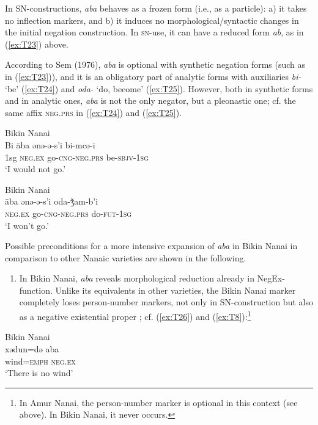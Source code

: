\documentclass[output=paper]{langscibook}
\begin{document}
In SN-constructions, \textit{aba} behaves as a frozen form (i.e., as a particle): a) it takes no inflection markers, and b) it induces no morphological/syntactic changes in the initial negation construction. In \textsc{sn}-use, it can have a reduced form \textit{ab}, as in (\ref{ex:T23}) above.

According to Sem (1976), \textit{aba} is optional with synthetic negation forms (such as in (\ref{ex:T23})), and it is an obligatory part of analytic forms with auxiliaries \textit{bi-} ‘be’ (\ref{ex:T24}) and \textit{oda-} ‘do, become’ (\ref{ex:T25}). However, both in synthetic forms and in analytic ones, \textit{aba} is not the only negator, but a pleonastic one; cf. the same affix \textsc{neg.prs} in (\ref{ex:T24}) and (\ref{ex:T25}).

\ea Bikin Nanai \label{ex:T24}\\
	\gll Bi	āba	ənə-ə-s'i					bi-mcə-i\\
	1sg	\textsc{neg.ex}	go-\textsc{cng-neg.prs}		be-\textsc{sbjv-1sg}\\
	\glt `I would not go.' \citep[76]{sem1976a}
\z

\ea Bikin Nanai \label{ex:T25}\\
	\gll āba	ənə-ə-s’i			oda-ǯam-b’i\\
	\textsc{neg.ex}	go-\textsc{cng-neg.prs}	do-\textsc{fut-1sg}\\
	\glt `I won’t go.' \citep[76]{sem1976a}
\z

Possible preconditions for a more intensive expansion of \textit{aba} in Bikin Nanai in comparison to other Nanaic varieties are shown in the following.

\begin{enumerate}
    \item In Bikin Nanai, \textit{aba} reveals morphological reduction already in NegEx-function. Unlike its equivalents in other varieties, the Bikin Nanai marker completely loses person-number markers, not only in SN-construction but also as a negative existential proper \citep[51]{sem1976a}; cf. (\ref{ex:T26}) and (\ref{ex:T8}):\footnote{In Amur Nanai, the person-number marker is optional in this context (see above). In Bikin Nanai, it never occurs.}
\end{enumerate}

\ea Bikin Nanai \label{ex:T26}\\
	\gll xədun=də	aba\\
	wind=\textsc{emph}	\textsc{neg.ex}\\
	\glt `There is no wind' \citep[51]{sem1976a}
\z
\end{document}
